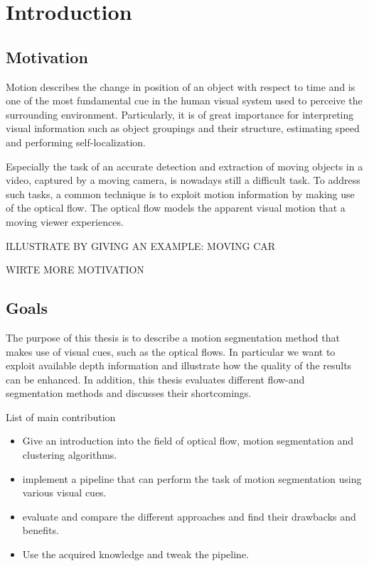 \chapter{Introduction}
\section{Motivation}

Motion describes the change in position of an object with respect to time and is one of the most fundamental cue in the human visual system used to perceive the surrounding environment. Particularly, it is of great importance for interpreting visual information such as object groupings and their structure, estimating speed and performing self-localization.

Especially the task of an accurate detection and extraction of moving objects in a video, captured by a moving camera, is nowadays still a difficult task. 
To address such tasks, a common technique is to exploit motion information by making use of the optical flow. The optical flow models the apparent visual motion that a moving viewer experiences.

ILLUSTRATE BY GIVING AN EXAMPLE: MOVING CAR

WIRTE MORE MOTIVATION


\section{Goals}

The purpose of this thesis is to describe a motion segmentation method that makes use of visual cues, such as the optical flows. In particular we want to exploit available depth information and illustrate how the quality of the results can be enhanced. In addition, this thesis evaluates different flow-and segmentation methods and discusses their shortcomings.

List of main contribution

\begin{itemize}
  \item Give an introduction into the field of optical flow, motion segmentation and clustering algorithms.
  \item implement a pipeline that can perform the task of motion segmentation using various visual cues.
  \item evaluate and compare the different approaches and find their drawbacks and benefits.
  \item Use the acquired knowledge and tweak the pipeline.
\end{itemize}


